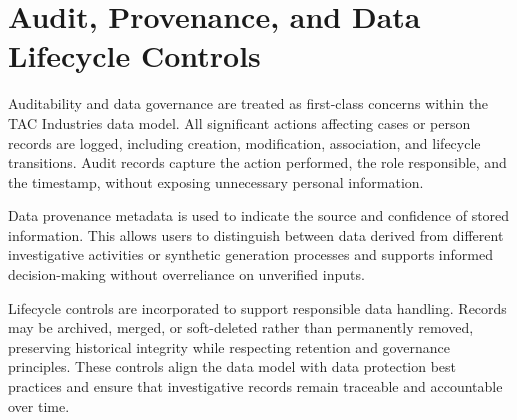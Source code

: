 \section{Audit, Provenance, and Data Lifecycle Controls}

Auditability and data governance are treated as first-class concerns within the TAC Industries data model. All significant actions affecting cases or person records are logged, including creation, modification, association, and lifecycle transitions. Audit records capture the action performed, the role responsible, and the timestamp, without exposing unnecessary personal information\cite{nist80092}.

Data provenance metadata is used to indicate the source and confidence of stored information. This allows users to distinguish between data derived from different investigative activities or synthetic generation processes and supports informed decision-making without overreliance on unverified inputs.

Lifecycle controls are incorporated to support responsible data handling. Records may be archived, merged, or soft-deleted rather than permanently removed, preserving historical integrity while respecting retention and governance principles\cite{gdpr2016}. These controls align the data model with data protection best practices and ensure that investigative records remain traceable and accountable over time.
